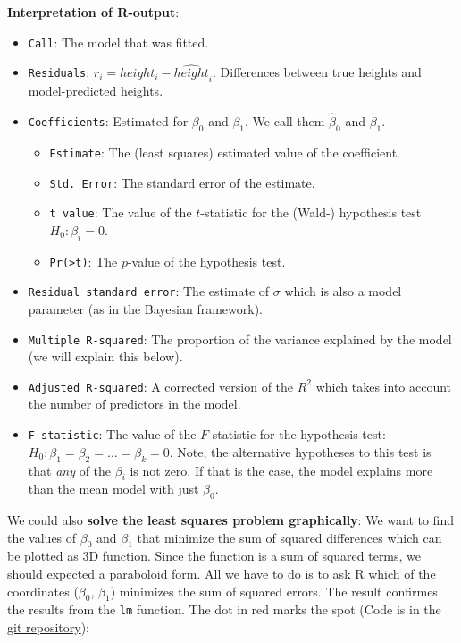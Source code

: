\documentclass[
]{book}
\providecommand{\tightlist}{%
  \setlength{\itemsep}{0pt}\setlength{\parskip}{0pt}}
\begin{document}
\textbf{Interpretation of R-output}:

\begin{itemize}
\tightlist
\item
  \texttt{Call}: The model that was fitted.
\item
  \texttt{Residuals}: \(r_i = height_i - \widehat{height}_i\).
  Differences between true heights and model-predicted heights.
\item
  \texttt{Coefficients}: Estimated for \(\beta_0\) and \(\beta_1\). We call them \(\hat{\beta}_0\) and \(\hat{\beta}_1\).

  \begin{itemize}
  \tightlist
  \item
    \texttt{Estimate}: The (least squares) estimated value of the coefficient.
  \item
    \texttt{Std.\ Error}: The standard error of the estimate.
  \item
    \texttt{t\ value}: The value of the \(t\)-statistic for the (Wald-) hypothesis test
    \(H_0: \beta_i = 0\).
  \item
    \texttt{Pr(\textgreater{}\textbar{}t\textbar{})}: The \(p\)-value of the hypothesis test.
  \end{itemize}
\item
  \texttt{Residual\ standard\ error}: The estimate of \(\sigma\)
  which is also a model parameter (as in the Bayesian framework).
\item
  \texttt{Multiple\ R-squared}: The proportion of the variance explained by the
  model (we will explain this below).
\item
  \texttt{Adjusted\ R-squared}: A corrected version of the \(R^2\) which takes into account
  the number of predictors in the model.
\item
  \texttt{F-statistic}: The value of the \(F\)-statistic for the hypothesis test:
  \(H_0: \beta_1 = \beta_2 = \dots = \beta_k = 0\). Note, the alternative
  hypotheses to this test is that \emph{any} of the \(\beta_i\) is not zero. If that is
  the case, the model explains more than the mean model with just \(\beta_0\).
\end{itemize}

We could also \textbf{solve the least squares problem graphically}: We want to find the
values of \(\beta_0\) and \(\beta_1\) that minimize the sum of squared differences
which can be plotted as 3D function. Since the function is a sum of squared terms,
we should expected a paraboloid form.
All we have to do is to ask R which of
the coordinates (\(\beta_0\), \(\beta_1\)) minimizes the sum of squared errors. The result confirmes
the results from the \texttt{lm} function. The dot in red marks the spot
(Code is in the \href{https://github.com/jdegenfellner/Script_QM2_ZHAW}{git repository}):
\end{document}
